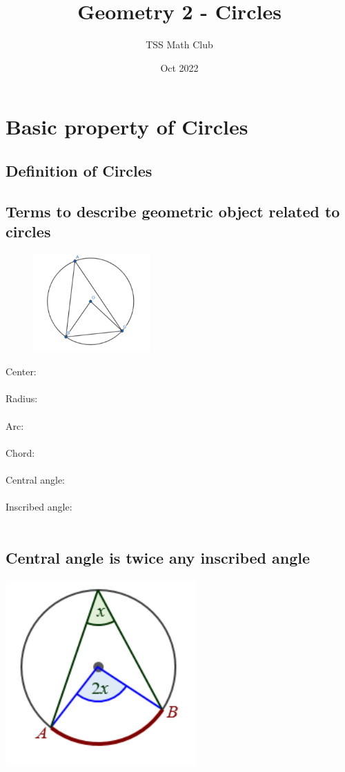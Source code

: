 \documentclass{article}
\title{Geometry 2 - Circles}
\author{TSS Math Club}
\date{Oct 2022}
\begin{document}
\large

\maketitle

\section{Basic property of Circles}
\subsection{Definition of Circles}
\subsection{Terms to describe geometric object related to circles}
\begin{figure} %
    \centering
    \includegraphics[width=0.4\textwidth]{Picture1.png}
\end{figure}
Center: \\ \\
Radius: \\ \\
Arc: \\ \\
Chord: \\ \\
Central angle: \\ \\
Inscribed angle: \\ \\


\subsection{Central angle is twice any inscribed angle}
\includegraphics{Picture2.png}
\end{document}
